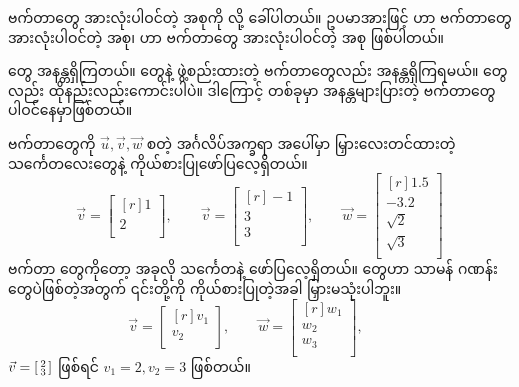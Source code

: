  ဗက်တာတွေ အားလုံးပါဝင်တဲ့ အစုကို  လို့ ခေါ်ပါတယ်။ ဥပမာအားဖြင့်  ဟာ  ဗက်တာတွေ အားလုံးပါဝင်တဲ့ အစု၊  ဟာ  ဗက်တာတွေ အားလုံးပါဝင်တဲ့ အစု ဖြစ်ပါတယ်။ 

 တွေ အနန္တရှိကြတယ်။  တွေနဲ့ ဖွဲ့စည်းထားတဲ့  ဗက်တာတွေလည်း အနန္တရှိကြရမယ်။  တွေလည်း ထိုနည်းလည်းကောင်းပါပဲ။ ဒါကြောင့်  တစ်ခုမှာ အနန္တများပြားတဲ့ ဗက်တာတွေ ပါဝင်နေမှာဖြစ်တယ်။ 

ဗက်တာတွေကို \(\vec{u}, \vec{v}, \vec{w}\) စတဲ့ အင်္ဂလိပ်အက္ခရာ အပေါ်မှာ မြှားလေးတင်ထားတဲ့ သင်္ကေတလေးတွေနဲ့ ကိုယ်စားပြုဖော်ပြလေ့ရှိတယ်။
\[
\vec{v} = \begin{bmatrix*}[r] 1\\ 2\\ \end{bmatrix*}, \qquad
\vec{v} = \begin{bmatrix*}[r] -1\\ 3\\ 3\\\end{bmatrix*}, \qquad
\vec{w} = \begin{bmatrix*}[r] 1.5\\ -3.2\\ \sqrt{2}\\ \sqrt{3}\\\end{bmatrix*}
\]
ဗက်တာ  တွေကိုတော့ အခုလို သင်္ကေတနဲ့ ဖော်ပြလေ့ရှိတယ်။  တွေဟာ သာမန် ဂဏန်းတွေပဲဖြစ်တဲ့အတွက် ၎င်းတို့ကို ကိုယ်စားပြုတဲ့အခါ မြှားမသုံးပါဘူး။
\[
\vec{v} = \begin{bmatrix*}[r] v_{1} \\ v_{2} \\ \end{bmatrix*}, \qquad
\vec{w} = \begin{bmatrix*}[r] w_{1} \\ w_{2} \\ w_{3} \\ \end{bmatrix*}, \qquad
\]
\(\vec{v} = \begin{bsmallmatrix*}[r] 2 \\ 3\\ \end{bsmallmatrix*}\) ဖြစ်ရင် $v_{1}=2, v_{2}=3$ ဖြစ်တယ်။

